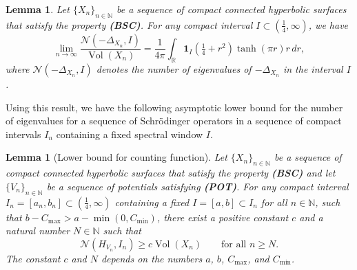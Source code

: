\documentclass[11pt,twoside,reqno]{amsart}
\newcommand{\R}{\mathbb{R}}
\newcommand{\N}{\mathbb{N}}
\newcommand{\1}{\mathrm{\mathbf{1}}}
\DeclareMathOperator{\Vol}{Vol}
\numberwithin{equation}{section}
\theoremstyle{plain}
\newtheorem{lemma}[thm]{Lemma}
\theoremstyle{definition}
\theoremstyle{remark}
\begin{document}
\begin{lemma}\label{LE:Weyl_laplace}
Let $\{X_n\}_{n\in\N}$ be a sequence of compact connected hyperbolic surfaces that satisfy the property {\normalfont\textbf{(BSC)}}. For any compact interval $I\subset (\frac{1}{4},\infty)$, we have 
\begin{equation}
    \lim_{n\rightarrow\infty} \frac{\mathcal{N}(-\Delta_{X_n},I)}{\Vol(X_n)} = \frac{1}{4\pi} \int_\R \boldsymbol{1}_I (\tfrac{1}{4} +r^2) \tanh(\pi r) r \, d r,
\end{equation}
where $\mathcal{N}(-\Delta_{X_n},I)$ denotes the number of eigenvalues of $-\Delta_{X_n}$ in the interval $I$. 
\end{lemma}

Using this result, we have the following asymptotic lower bound for the number of eigenvalues for a sequence of Schr\"odinger operators in a sequence of compact intervals $I_n$ containing a fixed spectral window $I$.

\begin{lemma}[Lower bound for counting function]\label{LE:Weyl_schrodinger}
Let $\{X_n\}_{n\in\N}$ be a sequence of compact connected hyperbolic surfaces that satisfy the property {\normalfont\textbf{(BSC)}} and let $\{V_n\}_{n\in\N}$ be a sequence of potentials satisfying {\normalfont\textbf{(POT)}}. For any compact interval $I_n = [a_n,b_n]\subset (\frac{1}{4},\infty)$ containing a fixed $I = [a,b] \subset I_n$ for all $n \in \N$, such that $b-C_{\max} >a  -\min(0, C_{\min})$, there exist a positive constant $c$ and a natural number $N\in\N$ such that 
\begin{equation}
    \mathcal{N}(H_{V_n},I_n) \geq c\Vol(X_n) \qquad\text{for all $n\geq N$.} 
\end{equation}
The constant $c$ and $N$ depends on the numbers $a$, $b$, $C_{\max}$, and $C_{\min}$.
\end{lemma}
\end{document}
